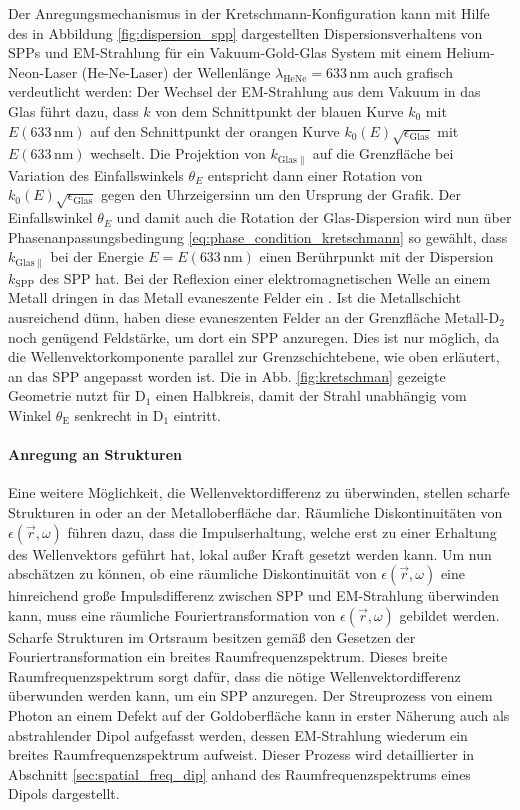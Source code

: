 \documentclass[titlepage,  ngerman]{article}
\begin{document}
	Der Anregungsmechanismus in der Kretschmann-Konfiguration kann mit Hilfe des in Abbildung \ref{fig:dispersion_spp} dargestellten Dispersionsverhaltens von SPPs und EM-Strahlung für ein Vakuum-Gold-Glas System mit einem Helium-Neon-Laser (He-Ne-Laser) der Wellenlänge $\lambda_{\mathrm{HeNe}}=633\,\mathrm{nm}$ auch grafisch verdeutlicht werden: Der Wechsel der EM-Strahlung aus dem Vakuum in das Glas führt dazu, dass $k$ von dem Schnittpunkt der blauen Kurve $k_0$ mit $E(633 \, \mathrm{nm})$ auf den Schnittpunkt der orangen Kurve $k_0(E)\sqrt{\epsilon_\mathrm{Glas}}$ mit $E(633 \, \mathrm{nm})$ wechselt. Die Projektion von $k_{\mathrm{Glas}\parallel}$ auf die Grenzfläche bei Variation des Einfallswinkels $\theta_E$ entspricht dann einer Rotation von $k_0(E)\sqrt{\epsilon_\mathrm{Glas}}$ gegen den Uhrzeigersinn um den Ursprung der Grafik. Der Einfallswinkel  $\theta_E$ und damit auch die Rotation der Glas-Dispersion wird nun über Phasenanpassungsbedingung \eqref{eq:phase_condition_kretschmann} so gewählt, dass $k_{\mathrm{Glas}\parallel}$ bei der Energie $E=E(633\,\mathrm{nm})$ einen Berührpunkt mit der Dispersion $k_\mathrm{SPP}$ des SPP hat.
	Bei der Reflexion einer elektromagnetischen Welle an einem Metall dringen in das Metall evaneszente Felder ein \cite{Novotny.2012b}. Ist die Metallschicht ausreichend dünn, haben diese evaneszenten Felder an der Grenzfläche Metall-$\mathrm{D}_2$ noch genügend Feldstärke, um dort ein SPP anzuregen. Dies ist nur möglich, da die Wellenvektorkomponente parallel zur Grenzschichtebene, wie oben erläutert, an das SPP angepasst worden ist. Die in Abb. \ref{fig:kretschman} gezeigte Geometrie nutzt für $\mathrm{D}_1$ einen Halbkreis, damit der Strahl unabhängig vom Winkel $\theta_\mathrm{E}$ senkrecht in $\mathrm{D}_1$ eintritt. \cite{Kretschmann.1971}
	\paragraph{Anregung an Strukturen}
	Eine weitere Möglichkeit, die Wellenvektordifferenz zu überwinden, stellen scharfe Strukturen in oder an der Metalloberfläche dar. Räumliche Diskontinuitäten von $\epsilon(\vec{r},\omega)$ führen dazu, dass die Impulserhaltung, welche erst zu einer Erhaltung des Wellenvektors geführt hat, lokal außer Kraft gesetzt werden kann. Um nun abschätzen zu können, ob eine räumliche Diskontinuität von $\epsilon(\vec{r},\omega)$ eine hinreichend große Impulsdifferenz zwischen SPP und EM-Strahlung überwinden kann, muss eine räumliche Fouriertransformation von $\epsilon(\vec{r},\omega)$ gebildet werden. Scharfe Strukturen im Ortsraum besitzen gemäß den Gesetzen der Fouriertransformation ein breites Raumfrequenzspektrum. Dieses breite Raumfrequenzspektrum sorgt dafür, dass die nötige Wellenvektordifferenz überwunden werden kann, um ein SPP anzuregen. Der Streuprozess von einem Photon an einem Defekt auf der Goldoberfläche kann in erster Näherung auch als abstrahlender Dipol aufgefasst werden, dessen EM-Strahlung wiederum ein breites Raumfrequenzspektrum aufweist. Dieser Prozess wird detaillierter in Abschnitt \ref{sec:spatial_freq_dip} anhand des Raumfrequenzspektrums eines Dipols dargestellt. \cite{Maier.2007}
\end{document}
